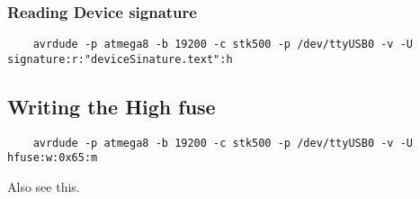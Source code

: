 \subsubsection{Reading Device signature}
\begin{verbatim}
    avrdude -p atmega8 -b 19200 -c stk500 -p /dev/ttyUSB0 -v -U signature:r:"deviceSinature.text":h
\end{verbatim}


\subsection{Writing the High fuse}
\begin{verbatim}
    avrdude -p atmega8 -b 19200 -c stk500 -p /dev/ttyUSB0 -v -U hfuse:w:0x65:m
\end{verbatim}

Also see this\cite{alsosee}.

% 
% 

% 
